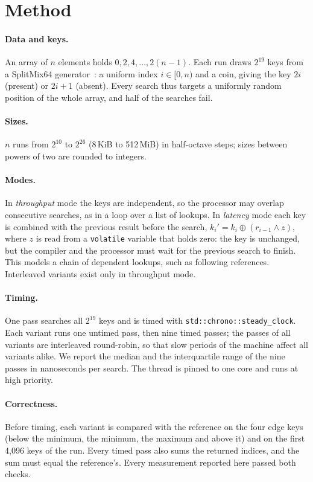\documentclass[11pt]{article}
\begin{document}
\section{Method}\label{sec:method}

\paragraph{Data and keys.} An array of $n$ elements holds $0, 2, 4, \ldots,
2(n-1)$. Each run draws $2^{19}$ keys from a SplitMix64
generator~\cite{steele2014splitmix}: a uniform index $i \in [0, n)$ and a coin,
giving the key $2i$ (present) or $2i+1$ (absent). Every search thus targets a
uniformly random position of the whole array, and half of the searches fail.

\paragraph{Sizes.} $n$ runs from $2^{10}$ to $2^{26}$ (8\,KiB to 512\,MiB) in
half-octave steps; sizes between powers of two are rounded to integers.

\paragraph{Modes.} In \emph{throughput} mode the keys are independent, so the
processor may overlap consecutive searches, as in a loop over a list of
lookups. In \emph{latency} mode each key is combined with the previous result
before the search, $k_i' = k_i \oplus (r_{i-1} \wedge z)$, where $z$ is read
from a \texttt{volatile} variable that holds zero: the key is unchanged, but
the compiler and the processor must wait for the previous search to finish.
This models a chain of dependent lookups, such as following references.
Interleaved variants exist only in throughput mode.

\paragraph{Timing.} One pass searches all $2^{19}$ keys and is timed with
\texttt{std::chrono::steady\_clock}. Each variant runs one untimed pass, then
nine timed passes; the passes of all variants are interleaved round-robin, so
that slow periods of the machine affect all variants alike. We report the
median and the interquartile range of the nine passes in nanoseconds per
search. The thread is pinned to one core and runs at high priority.

\paragraph{Correctness.} Before timing, each variant is compared with the
reference on the four edge keys (below the minimum, the minimum, the maximum and
above it) and on the first 4{,}096 keys of the run. Every timed pass also sums
the returned indices, and the sum must equal the reference's. Every
measurement reported here passed both checks.
\end{document}
